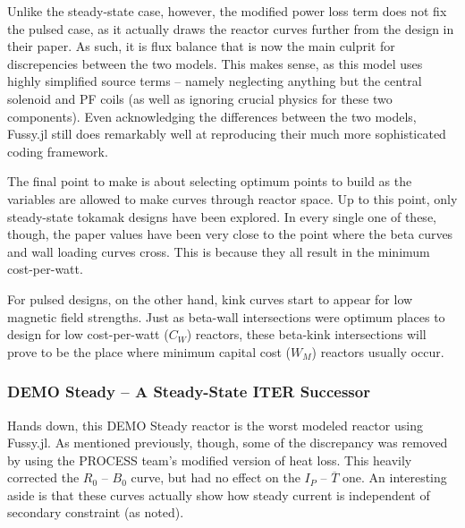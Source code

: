 Unlike the steady-state case, however, the modified power loss term does not fix the pulsed case, as it actually draws the reactor curves further from the design in their paper. As such, it is flux balance that is now the main culprit for discrepencies between the two models. This makes sense, as this model uses highly simplified source terms -- namely neglecting anything but the central solenoid and PF coils (as well as ignoring crucial physics for these two components). Even acknowledging the differences between the two models, Fussy.jl still does remarkably well at reproducing their much more sophisticated coding framework. 

The final point to make is about selecting optimum points to build as the  variables are allowed to make curves through reactor space. Up to this point, only steady-state tokamak designs have been explored. In every single one of these, though, the paper values have been very close to the point where the beta curves and wall loading curves cross. This is because they all result in the minimum cost-per-watt. 

For pulsed designs, on the other hand, kink curves start to appear for low magnetic field strengths. Just as beta-wall intersections were optimum places to design for low cost-per-watt ($C_W$) reactors, these beta-kink intersections will prove to be the place where minimum capital cost ($W_M$) reactors usually occur.

\newpage 

\subsubsection{DEMO Steady -- A Steady-State ITER Successor}

Hands down, this DEMO Steady reactor is the worst modeled reactor using Fussy.jl. As mentioned previously, though, some of the discrepancy was removed by using the PROCESS team's modified version of heat loss. This heavily corrected the $R_0$ -- $B_0$ curve, but had no effect on the $I_P$ -- $\overline T$ one. An interesting aside is that these curves actually show how steady current is independent of secondary constraint (as noted).

